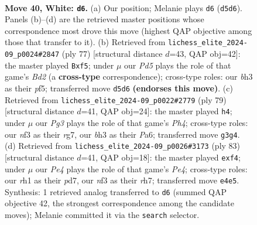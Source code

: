 \documentclass[11pt]{article}
\begin{document}
\begin{figure}[p]\centering
\begin{subfigure}{0.46\textwidth}\centering
\resizebox{\linewidth}{!}{%
\newchessgame
\chessboard[
  setfen={7k/R4p1p/5rp1/3P4/1p2P3/5nPb/4K2P/7r w - - 0 40},
  showmover=false,
  pgfstyle=straightmove, color=movearrow, markmove={d5-d6}
]}
\caption{}
\end{subfigure}\hfill
\begin{subfigure}{0.46\textwidth}\centering
\resizebox{\linewidth}{!}{%
\newchessgame
\chessboard[
  setfen={8/2kb1p2/p2N1p2/1p3P1r/1P1R4/3P4/P7/1K6 b - - 2 39},
  showmover=false,
  pgfstyle=straightmove, color=movearrow, markmove={d7-f5}
]}
\caption{}
\end{subfigure}
\\[4pt]
\begin{subfigure}{0.46\textwidth}\centering
\resizebox{\linewidth}{!}{%
\newchessgame
\chessboard[
  setfen={3r3k/5pR1/p7/7p/1PpNpP2/2P1K3/1P6/6R1 b - - 1 40},
  showmover=false,
  pgfstyle=straightmove, color=movearrow, markmove={h5-h4}
]}
\caption{}
\end{subfigure}\hfill
\begin{subfigure}{0.46\textwidth}\centering
\resizebox{\linewidth}{!}{%
\newchessgame
\chessboard[
  setfen={6k1/3P2pR/2p3P1/2P1pp1N/p4P2/P2R4/7P/1K6 b - - 0 42},
  showmover=false,
  pgfstyle=straightmove, color=movearrow, markmove={e5-f4}
]}
\caption{}
\end{subfigure}
\caption{\textbf{Move 40, White: \texttt{d6}.} (a) Our position; Melanie plays \texttt{d6} (\texttt{d5d6}). Panels (b)--(d) are the retrieved master positions whose correspondence most drove this move (highest QAP objective among those that transfer to it). (b) Retrieved from \texttt{lichess\_elite\_2024-09\_p0024\#2847} (ply 77) [structural distance $d$=43, QAP obj=42]: the master played \texttt{Bxf5}; under $\mu$ our \emph{Pd5} plays the role of that game's \emph{Bd2} (a \textbf{cross-type} correspondence); cross-type roles: our \emph{b}h3 as their \emph{p}f5; transferred move \texttt{d5d6} \textbf{(endorses this move)}. (c) Retrieved from \texttt{lichess\_elite\_2024-09\_p0022\#2779} (ply 79) [structural distance $d$=41, QAP obj=24]: the master played \texttt{h4}; under $\mu$ our \emph{Pg3} plays the role of that game's \emph{Ph4}; cross-type roles: our \emph{n}f3 as their \emph{r}g7, our \emph{b}h3 as their \emph{P}a6; transferred move \texttt{g3g4}. (d) Retrieved from \texttt{lichess\_elite\_2024-09\_p0026\#3173} (ply 83) [structural distance $d$=41, QAP obj=18]: the master played \texttt{exf4}; under $\mu$ our \emph{Pe4} plays the role of that game's \emph{Pe4}; cross-type roles: our \emph{r}h1 as their \emph{p}d7, our \emph{n}f3 as their \emph{r}h7; transferred move \texttt{e4e5}. Synthesis: 1 retrieved analog transferred to \texttt{d6} (summed QAP objective 42, the strongest correspondence among the candidate moves); Melanie committed it via the \texttt{search} selector.}
\label{fig:thought-m78}
\end{figure}
\end{document}
